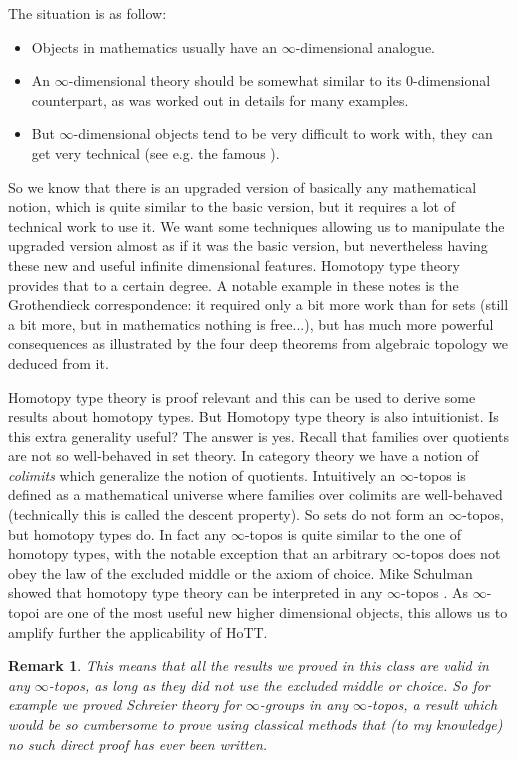 \documentclass{article}
\newtheorem{remark}{Remark}
\begin{document}
The situation is as follow:
\begin{itemize}
\item Objects in mathematics usually have an $\infty$-dimensional analogue.
\item An $\infty$-dimensional theory should be somewhat similar to its $0$-dimensional counterpart, as was worked out in details for many examples.
\item But $\infty$-dimensional objects tend to be very difficult to work with, they can get very technical (see e.g. the famous \cite{lurie2009higher}).
\end{itemize}

So we know that there is an upgraded version of basically any mathematical notion, which is quite similar to the basic version, but it requires a lot of technical work to use it. We want some techniques allowing us to manipulate the upgraded version almost as if it was the basic version, but nevertheless having these new and useful infinite dimensional features. Homotopy type theory provides that to a certain degree. A notable example in these notes is the Grothendieck correspondence: it required only a bit more work than for sets (still a bit more, but in mathematics nothing is free...), but has much more powerful consequences as illustrated by the four deep theorems from algebraic topology we deduced from it. 

Homotopy type theory is proof relevant and this can be used to derive some results about homotopy types. But Homotopy type theory is also intuitionist. Is this extra generality useful? The answer is yes. Recall that families over quotients are not so well-behaved in set theory. In category theory we have a notion of \emph{colimits} which generalize the notion of quotients. Intuitively an $\infty$-topos is defined as a mathematical universe where families over colimits are well-behaved (technically this is called the descent property). So sets do not form an $\infty$-topos, but homotopy types do. In fact any $\infty$-topos is quite similar to the one of homotopy types, with the notable exception that an arbitrary $\infty$-topos does not obey the law of the excluded middle or the axiom of choice. Mike Schulman showed that homotopy type theory can be interpreted in any $\infty$-topos \cite{shulman2019all}. As $\infty$-topoi are one of the most useful new higher dimensional objects, this allows us to amplify further the applicability of HoTT.

\begin{remark}
This means that all the results we proved in this class are valid in any $\infty$-topos, as long as they did not use the excluded middle or choice. So for example we proved Schreier theory for $\infty$-groups in any $\infty$-topos, a result which would be so cumbersome to prove using classical methods that (to my knowledge) no such direct proof has ever been written.
\end{remark}
\end{document}
